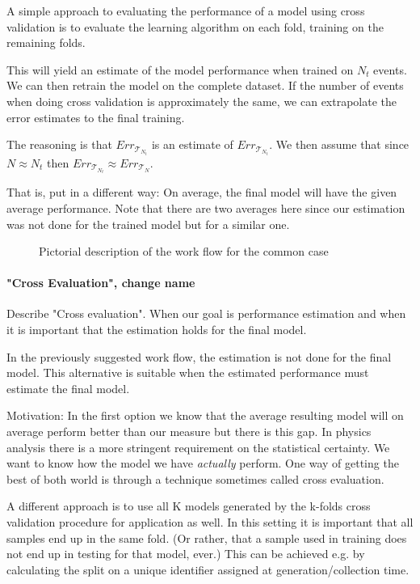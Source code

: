 A simple approach to evaluating the performance of a model using cross validation is to evaluate the learning algorithm on each fold, training on the remaining folds.

This will yield an estimate of the model performance when trained on $N_t$ events. We can then retrain the model on the complete dataset. If the number of events when doing cross validation is approximately the same, we can extrapolate the error estimates to the final training.

The reasoning is that $Err_{\mathcal{T}_{N_t}}$ is an estimate of $Err_{\mathcal{T}_{N_t}}$. We then assume that since $N \approx N_t$ then $Err_{\mathcal{T}_{N_t}} \approx Err_{\mathcal{T}_{N}}$.

That is, put in a different way: On average, the final model will have the given average performance. Note that there are two averages here since our estimation was not done for the trained model but for a similar one.

\begin{center}
\begin{figure}
   \missingfigure{}
   \label{fig:workflow0}
   \caption{Pictorial description of the work flow for the common case}
\end{figure}
\end{center}

\paragraph{"Cross Evaluation", change name}
Describe "Cross evaluation". When our goal is performance estimation and when it is important that the estimation holds for the final model.

In the previously suggested work flow, the estimation is not done for the final model. This alternative is suitable when the estimated performance must estimate the final model.

Motivation:
In the first option we know that the average resulting model will on average
perform better than our measure but there is this gap. In physics analysis
there is a more stringent requirement on the statistical certainty. We want to
know how the model we have \emph{actually} perform. One way of getting the best of
both world is through a technique sometimes called cross evaluation.


A different approach is to use all K models generated by the k-folds cross validation procedure for application as well. In this setting it is important that all samples end up in the same fold. (Or rather, that a sample used in training does not end up in testing for that model, ever.) This can be achieved e.g. by calculating the split on a unique identifier assigned at generation/collection time.


